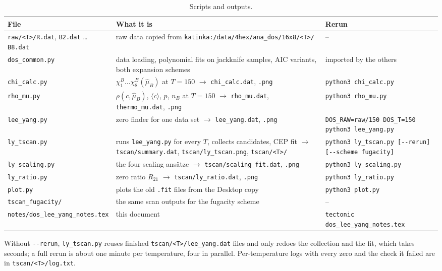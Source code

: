 \documentclass[11pt,a4paper]{article}
\newcommand{\hmu}{\hat{\mu}_B}
\newcommand{\code}[1]{\texttt{#1}}
\begin{document}
\begin{table}[H]
\centering\footnotesize
\begin{tabular}{P{4.7cm}P{5.8cm}P{4.5cm}}
\toprule
File & What it is & Rerun \\
\midrule
\code{raw/<T>/R.dat}, \code{B2.dat} \dots \code{B8.dat} & raw data copied from \code{katinka:/data/4hex/ana\_dos/16x8/<T>/} & -- \\
\code{dos\_common.py} & data loading, polynomial fits on jackknife samples, AIC variants, both expansion schemes & imported by the others \\
\code{chi\_calc.py} & $\chi^B_1\ldots\chi^B_8(\hmu)$ at $T=150$ $\to$ \code{chi\_calc.dat}, \code{.png} & \code{python3 chi\_calc.py} \\
\code{rho\_mu.py} & $\rho(c,\hmu)$, $\langle c\rangle$, $p$, $n_B$ at $T=150$ $\to$ \code{rho\_mu.dat}, \code{thermo\_mu.dat}, \code{.png} & \code{python3 rho\_mu.py} \\
\code{lee\_yang.py} & zero finder for one data set $\to$ \code{lee\_yang.dat}, \code{.png} & \code{DOS\_RAW=raw/150 DOS\_T=150 python3 lee\_yang.py} \\
\code{ly\_tscan.py} & runs \code{lee\_yang.py} for every $T$, collects candidates, CEP fit $\to$ \code{tscan/summary.dat}, \code{tscan/ly\_tscan.png}, \code{tscan/<T>/} & \code{python3 ly\_tscan.py [-{}-rerun] [-{}-scheme fugacity]} \\
\code{ly\_scaling.py} & the four scaling ans\"atze $\to$ \code{tscan/scaling\_fit.dat}, \code{.png} & \code{python3 ly\_scaling.py} \\
\code{ly\_ratio.py} & zero ratio $R_{21}$ $\to$ \code{tscan/ly\_ratio.dat}, \code{.png} & \code{python3 ly\_ratio.py} \\
\code{plot.py} & plots the old \code{.fit} files from the Desktop copy & \code{python3 plot.py} \\
\code{tscan\_fugacity/} & the same scan outputs for the fugacity scheme & -- \\
\code{notes/dos\_lee\_yang\_notes.tex} & this document & \code{tectonic dos\_lee\_yang\_notes.tex} \\
\bottomrule
\end{tabular}
\caption{Scripts and outputs.}
\end{table}

Without \code{-{}-rerun}, \code{ly\_tscan.py} reuses finished \code{tscan/<T>/lee\_yang.dat} files and only redoes the collection and the fit, which takes seconds; a full rerun is about one minute per temperature, four in parallel. Per-temperature logs with every zero and the check it failed are in \code{tscan/<T>/log.txt}.
\end{document}
